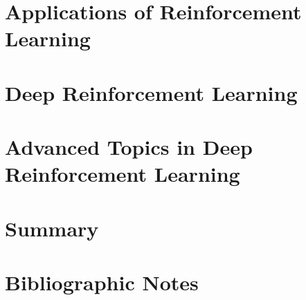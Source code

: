 \section{Applications of Reinforcement Learning}
\section{Deep Reinforcement Learning}
\section{Advanced Topics in Deep Reinforcement Learning}
\section{Summary}
\section{Bibliographic Notes}


